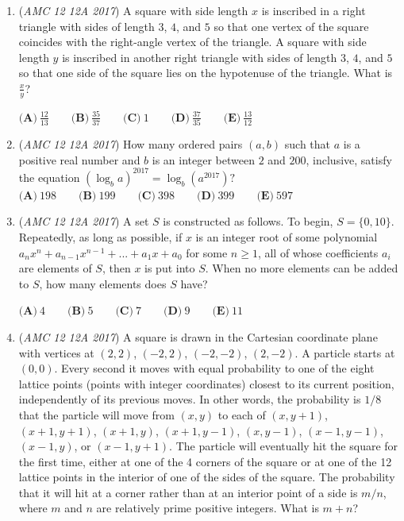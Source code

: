 \begin{enumerate}
 $\textbf{(A)}\ 1 \qquad\textbf{(B)}\ 3\qquad\textbf{(C)}\ 12\qquad\textbf{(D)}\ 1239\qquad\textbf{(E)}\ 1265$


	\item (\textit{AMC 12 12A 2017}) A square with side length $x$ is inscribed in a right triangle with sides of length $3$, $4$, and $5$ so that one vertex of the square coincides with the right-angle vertex of the triangle. A square with side length $y$ is inscribed in another right triangle with sides of length $3$, $4$, and $5$ so that one side of the square lies on the hypotenuse of the triangle. What is $\frac{x}{y}$?


 $\textbf{(A)}\ \frac{12}{13} \qquad \textbf{(B)}\ \frac{35}{37} \qquad\textbf{(C)}\ 1 \qquad\textbf{(D)}\ \frac{37}{35} \qquad\textbf{(E)}\ \frac{13}{12}$


	\item (\textit{AMC 12 12A 2017}) How many ordered pairs $(a,b)$ such that $a$ is a positive real number and $b$ is an integer between $2$ and $200$, inclusive, satisfy the equation $(\log_b a)^{2017}=\log_b(a^{2017})?$
$\textbf{(A)}\ 198\qquad\textbf{(B)}\ 199\qquad\textbf{(C)}\ 398\qquad\textbf{(D)}\ 399\qquad\textbf{(E)}\ 597$


	\item (\textit{AMC 12 12A 2017}) A set $S$ is constructed as follows. To begin, $S = \{0,10\}$. Repeatedly, as long as possible, if $x$ is an integer root of some polynomial $a_{n}x^n + a_{n-1}x^{n-1} + ... + a_{1}x + a_0$ for some $n\geq{1}$, all of whose coefficients $a_i$ are elements of $S$, then $x$ is put into $S$. When no more elements can be added to $S$, how many elements does $S$ have?


 $\textbf{(A)}\ 4 \qquad \textbf{(B)}\ 5 \qquad\textbf{(C)}\ 7 \qquad\textbf{(D)}\ 9 \qquad\textbf{(E)}\ 11$


	\item (\textit{AMC 12 12A 2017}) A square is drawn in the Cartesian coordinate plane with vertices at $(2, 2)$, $(-2, 2)$, $(-2, -2)$, $(2, -2)$. A particle starts at $(0,0)$. Every second it moves with equal probability to one of the eight lattice points (points with integer coordinates) closest to its current position, independently of its previous moves. In other words, the probability is $1/8$ that the particle will move from $(x, y)$ to each of $(x, y + 1)$, $(x + 1, y + 1)$, $(x + 1, y)$, $(x + 1, y - 1)$, $(x, y - 1)$, $(x - 1, y - 1)$, $(x - 1, y)$, or $(x - 1, y + 1)$. The particle will eventually hit the square for the first time, either at one of the 4 corners of the square or at one of the 12 lattice points in the interior of one of the sides of the square. The probability that it will hit at a corner rather than at an interior point of a side is $m/n$, where $m$ and $n$ are relatively prime positive integers. What is $m + n$?



\end{enumerate}
